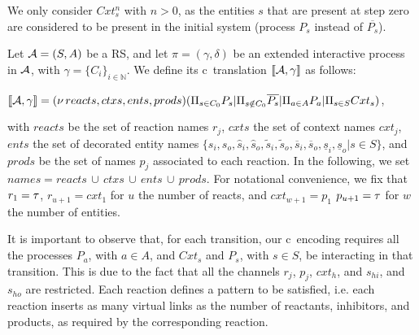 We only consider $Cxt_s^n$ with $n >0$, as the entities $s$ that are present at step zero  are considered to be present in the initial system (process $P_s$ instead of $\overline{P_s}$).






\begin{definition}[Translation]
\label{def:trans}
Let ${\cal A} = (S, A)$ be a RS, and let $\pi=(\gamma,\delta)$ be an extended interactive process in ${\cal A}$, with  $\gamma=\{C_i\}_{i\in\mathbb{N}}$. 
We define its c\CNA~translation $\llbracket{\cal A},\gamma \rrbracket$ as follows: 
\begin{center}$\llbracket{\cal A},\gamma \rrbracket = (\nu\, reacts,ctxs,ents,prods)(\Pi_{s\in C_0}P_{s} | \Pi_{s \notin C_0}\overline{P_s} | \Pi_{a\in A} P_a| \Pi_{s\in S} Cxt_s)$,
\end{center} 
with  $reacts$ be the set of reaction names $r_j $, $cxts$ the set of context names $cxt_j$,  $ents$ the set of decorated entity names  $\{s_i,s_o,\hat{s}_i,\hat{s}_o,\tilde{s}_i,\tilde{s}_o,\overline{s}_i,\overline{s}_o,\underline{s}_i,\underline{s}_o| s \in S\}$, and  $prods$ be the set of names $p_j$ associated to each reaction. 
In the following, we set $names = reacts\, \cup\, ctxs\, \cup\, ents\, \cup \, prods$.
For notational convenience, we fix that $r_1 = \tau$,  $r_{u+1} = cxt_1$ for $u$ the number of reacts, and $cxt_{w+1} = p_1$ $p_{u+1}=\tau$ for $w$ the number of entities.
\end{definition}
 



It is important to observe that,   for each transition, our c\CNA \ encoding requires  all the processes $P_a$, with $a \in A$, and  $Cxt_s$ and  $P_s$, with $s \in S$,  be interacting in that transition.
This is due to the fact that  all the channels $r_j$, $p_j$, $cxt_h$, and $s_{hi}$, and $s_{ho}$ are  restricted.
Each reaction defines a pattern to be satisfied, i.e. each reaction inserts as many virtual links  as  the number of reactants, inhibitors, and products, as required by the corresponding reaction.


